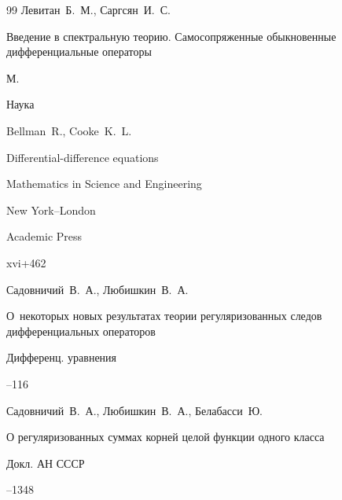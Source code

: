 \begin{thebibliography}{99}
\by Левитан~Б.~М., Саргсян~И.~С. 

\book Введение в спектральную теорию. Самосопряженные обыкновенные дифференциальные операторы

\publaddr  М.

\publ Наука







\by Bellman~R., Cooke~K.~L.

\book Differential-difference equations


\serial Mathematics in Science and Engineering


\publaddr New York--London

\publ Academic Press

\totalpages xvi+462 





\by Садовничий~В.~А., Любишкин~В.~А.

\paper О~некоторых новых результатах теории регуляризованных следов дифференциальных операторов

\jour Дифференц. уравнения




--116






\by Садовничий~В.~А., Любишкин~В.~А., Белабасси~Ю.

\paper О регуляризованных суммах корней целой функции одного класса

\jour Докл. АН СССР




--1348





\end{thebibliography}
